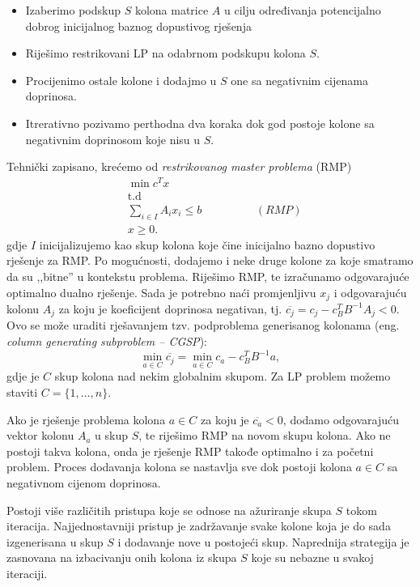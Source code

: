 \documentclass[a4paper, utf8, 11pt, colorlinks]{book}
\theoremstyle{definition}
\begin{document}
\begin{itemize}
   \item Izaberimo podskup $S$ kolona matrice $A$ u cilju određivanja potencijalno dobrog inicijalnog baznog dopustivog rješenja
    \item Riješimo restrikovani LP na odabrnom podskupu kolona $S$.
    \item Procijenimo ostale kolone i dodajmo u $S$ one sa negativnim 
          cijenama doprinosa.
    \item Itrerativno pozivamo perthodna dva koraka dok god postoje kolone   sa negativnim doprinosom koje nisu u $S$.
\end{itemize}
Tehnički zapisano, krećemo od \emph{restrikovanog master problema} (RMP)
\begin{align*}
    &\min c^T x \\
    &\mbox{t.d} \\
    & \sum_{i \in I} A_i x_i  \leq b \hspace{2cm} (RMP)\\
    & x \geq 0. 
\end{align*}
gdje $I$ inicijalizujemo kao skup kolona koje čine inicijalno bazno dopustivo rješenje  za RMP. Po mogućnosti, dodajemo i neke druge kolone za koje smatramo da su ,,bitne'' u kontekstu problema.  Riješimo RMP,  te izračunamo odgovarajuće optimalno dualno rješenje. Sada je potrebno naći promjenljivu $x_j$ i odgovarajuću kolonu $A_j$ za koju je koeficijent doprinosa negativan, tj. $\overline{c_j} = c_j - c_B^T B^{-1}A_j < 0$.
Ovo se može uraditi rješavanjem tzv. podproblema generisanog kolonama (eng. \emph{column generating subproblem -- CGSP}):
$$\min_{a \in C} \overline{c_j} = \min_{a \in C} c_a - c_B^T B^{-1} a,$$
gdje je $C$ skup kolona nad nekim globalnim skupom. Za LP problem možemo staviti $C = \{1,\ldots,n\}$. 

Ako je rješenje problema kolona $a \in C$ za koju je $\overline{c_a}<0$, dodamo odgovarajuću vektor kolonu $A_a$ u skup $S$, te riješimo  RMP na novom skupu kolona. Ako ne postoji takva kolona, onda je rješenje RMP takođe optimalno i za početni problem. %
 Proces dodavanja kolona se nastavlja sve dok postoji kolona $a\in C$ sa negativnom cijenom doprinosa. 

Postoji više različitih pristupa koje se odnose na ažuriranje skupa $S$ tokom iteracija. 
Najjednostavniji pristup je zadržavanje svake kolone koja je do sada izgenerisana  u skup $S$ i dodavanje  nove u postojeći skup. Naprednija strategija je zasnovana na izbacivanju onih kolona iz skupa $S$ koje su nebazne u svakoj iteraciji. 
\end{document}
